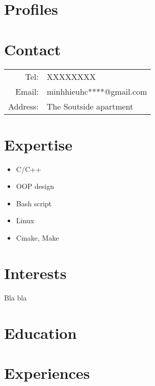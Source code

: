 \documentclass[11pt,oneside,a4paper]{article}
\begin{document}
\begin{tcolorbox}
    \begin{minipage}[t]{8cm}
        \vspace*{-0.5cm}
        \begin{tcolorbox}[grow to left by=0.6cm, colback=gray!25,colframe=white]
            \section*{Profiles}
            \blindtext

            \section*{Contact}
            \begin{tabular}{r l}
                Tel: & XXXXXXXX \\
                Email: & minhhieuhc****@gmail.com \\
                Address: & The Soutside apartment
            \end{tabular}
            
            \section*{Expertise}
            \begin{itemize}
                \item {C/C++}
                \item {OOP design}
                \item {Bash script}
                \item {Linux}
                \item {Cmake, Make}
            \end{itemize}
            
            \section*{Interests}
            Bla bla
        \end{tcolorbox}
    \end{minipage}
    \begin{minipage}[t]{11cm}
        \vspace*{-0.5cm}
        \begin{tcolorbox}[grow to right by=0.75cm,colback=white,colframe=white]
            \section*{Education}
            \section*{Experiences}
        \end{tcolorbox}
    \end{minipage}

\end{tcolorbox}
\end{document}
